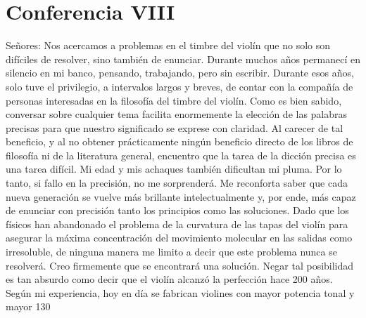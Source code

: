 \chapter*{Conferencia VIII}
Señores: Nos acercamos a problemas en el timbre del violín que no solo son difíciles de resolver, sino también de enunciar. Durante muchos años permanecí en silencio en mi banco, pensando, trabajando, pero sin escribir. Durante esos años, solo tuve el privilegio, a intervalos largos y breves, de contar con la compañía de personas interesadas en la filosofía del timbre del violín. Como es bien sabido, conversar sobre cualquier tema facilita enormemente la elección de las palabras precisas para que nuestro significado se exprese con claridad. Al carecer de tal beneficio, y al no obtener prácticamente ningún beneficio directo de los libros de filosofía ni de la literatura general, encuentro que la tarea de la dicción precisa es una tarea difícil. Mi edad y mis achaques también dificultan mi pluma. Por lo tanto, si fallo en la precisión, no me sorprenderá. Me reconforta saber que cada nueva generación se vuelve más brillante intelectualmente y, por ende, más capaz de enunciar con precisión tanto los principios como las soluciones. Dado que los físicos han abandonado el problema de la curvatura de las tapas del violín para asegurar la máxima concentración del movimiento molecular en las salidas como irresoluble, de ninguna manera me limito a decir que este problema nunca se resolverá. Creo firmemente que se encontrará una solución. Negar tal posibilidad es tan absurdo como decir que el violín alcanzó la perfección hace 200 años. Según mi experiencia, hoy en día se fabrican violines con mayor potencia tonal y mayor
130

